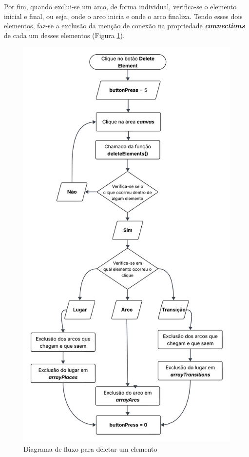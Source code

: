 \documentclass[
	12pt,				%
	openright,			%
	oneside,			%
	a4paper,			%
	english,			%
	brazil				%
	]{abntex2}
\theoremstyle{doispontos}
\begin{document}
Por fim, quando exclui-se um arco, de forma individual, verifica-se o elemento inicial e final, ou seja, onde o arco inicia e onde o arco finaliza. Tendo esses dois elementos, faz-se a exclusão da menção de conexão na propriedade \textbf{\textit{connections}} de cada um desses elementos (Figura \ref{fig:deleteElementDiagram}).

\begin{figure}[ht] 
	\centering
	\includegraphics[scale=0.15]{figuras/diagrama-fluxo-deleteElement.png}
	\caption[Diagrama de fluxo para deletar um elemento]{Diagrama de fluxo para deletar um elemento}
	\label{fig:deleteElementDiagram}
\end{figure}
\FloatBarrier
\end{document}
